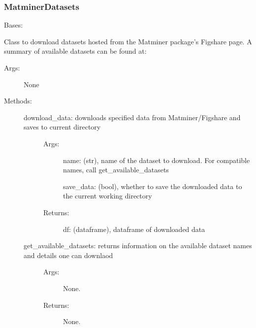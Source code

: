 \documentclass[letterpaper,10pt,english]{sphinxmanual}
\begin{document}
\subsubsection{MatminerDatasets}
\label{\detokenize{api/mastml.datasets.MatminerDatasets:matminerdatasets}}\label{\detokenize{api/mastml.datasets.MatminerDatasets::doc}}

\begin{fulllineitems}
\label{\detokenize{api/mastml.datasets.MatminerDatasets:mastml.datasets.MatminerDatasets}}
Bases: 

Class to download datasets hosted from the Matminer package’s Figshare page. A summary of available datasets
can be found at: 
\begin{description}
\item[{Args:}] \leavevmode
None

\item[{Methods:}] \leavevmode\begin{description}
\item[{download\_data: downloads specified data from Matminer/Figshare and saves to current directory}] \leavevmode\begin{description}
\item[{Args:}] \leavevmode
name: (str), name of the dataset to download. For compatible names, call get\_available\_datasets

save\_data: (bool), whether to save the downloaded data to the current working directory

\item[{Returns:}] \leavevmode
df: (dataframe), dataframe of downloaded data

\end{description}

\item[{get\_available\_datasets: returns information on the available dataset names and details one can downlaod}] \leavevmode\begin{description}
\item[{Args:}] \leavevmode
None.

\item[{Returns:}] \leavevmode
None.


\end{description}
\end{description}
\end{description}
\end{fulllineitems}
\end{document}
